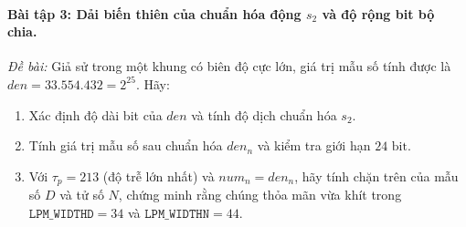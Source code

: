 \paragraph{Bài tập 3: Dải biến thiên của chuẩn hóa động $s_2$ và độ rộng bit bộ chia.}
\emph{Đề bài:} Giả sử trong một khung có biên độ cực lớn, giá trị mẫu số tính được là $den = 33.554.432 = 2^{25}$. Hãy:
\begin{enumerate}[label=(\alph*), leftmargin=1.5em, itemsep=2pt]
    \item Xác định độ dài bit của $den$ và tính độ dịch chuẩn hóa $s_2$.
    \item Tính giá trị mẫu số sau chuẩn hóa $den_n$ và kiểm tra giới hạn $24\text{ bit}$.
    \item Với $\tau_p = 213$ (độ trễ lớn nhất) và $num_n = den_n$, hãy tính chặn trên của mẫu số $D$ và tử số $N$, chứng minh rằng chúng thỏa mãn vừa khít trong $\texttt{LPM\_WIDTHD} = 34$ và $\texttt{LPM\_WIDTHN} = 44$.
\end{enumerate}

